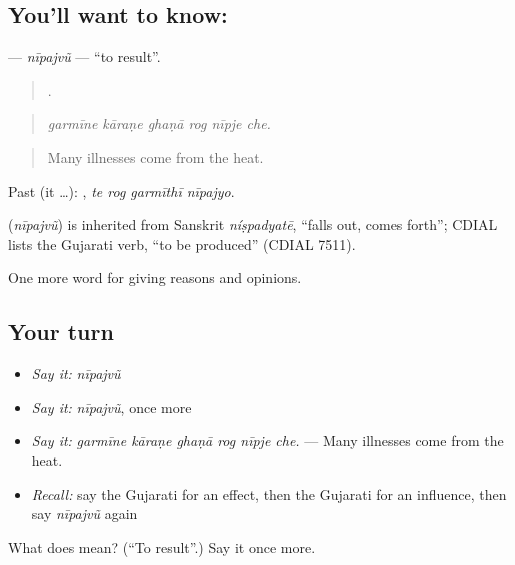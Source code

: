 \subsection*{You'll want to know: }
\textbf{} — \emph{nīpajvũ} — \textquotedblleft{}to result\textquotedblright{}.

\begin{quote}
     .
\end{quote}

\begin{quote}
\emph{garmīne kāraṇe ghaṇā rog nīpje che.}
\end{quote}

\begin{quote}
Many illnesses come from the heat.
\end{quote}

Past (it …):    , \emph{te rog garmīthī nīpajyo}.

\begin{cousinweb}
\textbf{} (\emph{nīpajvũ}) is inherited from Sanskrit \emph{níṣpadyatē}, \textquotedblleft{}falls out, comes forth\textquotedblright{}; CDIAL lists the Gujarati verb, \textquotedblleft{}to be produced\textquotedblright{} (CDIAL 7511).
\end{cousinweb}

\begin{grammarlens}[title={What you've built}]
One more word for giving reasons and opinions.
\end{grammarlens}

\subsection*{Your turn}
\begin{itemize}
\raggedright
  \item \emph{Say it:} \emph{nīpajvũ}
  \item \emph{Say it:} \emph{nīpajvũ}, once more
  \item \emph{Say it:} \emph{garmīne kāraṇe ghaṇā rog nīpje che.} — Many illnesses come from the heat.
  \item \emph{Recall:} say the Gujarati for an effect, then the Gujarati for an influence, then say \emph{nīpajvũ} again
\end{itemize}

\begin{tcolorbox}[breakable,colback=teal!4,colframe=teal!35!black,title={Before you move on}]
What does  mean? (\textquotedblleft{}To result\textquotedblright{}.) Say it once more.
\end{tcolorbox}
